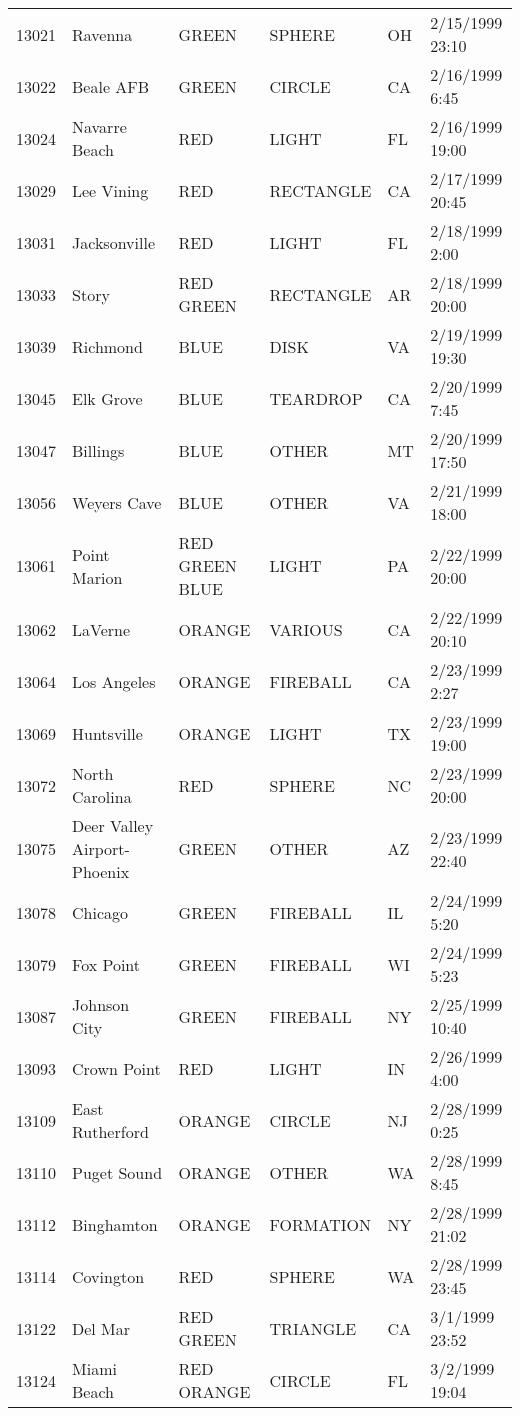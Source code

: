 \begin{tabular}{llllll}
13021 & Ravenna & GREEN & SPHERE & OH & 2/15/1999 23:10 \\
13022 & Beale AFB & GREEN & CIRCLE & CA & 2/16/1999 6:45 \\
13024 & Navarre Beach & RED & LIGHT & FL & 2/16/1999 19:00 \\
13029 & Lee Vining & RED & RECTANGLE & CA & 2/17/1999 20:45 \\
13031 & Jacksonville & RED & LIGHT & FL & 2/18/1999 2:00 \\
13033 & Story & RED GREEN & RECTANGLE & AR & 2/18/1999 20:00 \\
13039 & Richmond & BLUE & DISK & VA & 2/19/1999 19:30 \\
13045 & Elk Grove & BLUE & TEARDROP & CA & 2/20/1999 7:45 \\
13047 & Billings & BLUE & OTHER & MT & 2/20/1999 17:50 \\
13056 & Weyers Cave & BLUE & OTHER & VA & 2/21/1999 18:00 \\
13061 & Point Marion & RED GREEN BLUE & LIGHT & PA & 2/22/1999 20:00 \\
13062 & LaVerne & ORANGE & VARIOUS & CA & 2/22/1999 20:10 \\
13064 & Los Angeles & ORANGE & FIREBALL & CA & 2/23/1999 2:27 \\
13069 & Huntsville & ORANGE & LIGHT & TX & 2/23/1999 19:00 \\
13072 & North Carolina & RED & SPHERE & NC & 2/23/1999 20:00 \\
13075 & Deer Valley Airport-Phoenix & GREEN & OTHER & AZ & 2/23/1999 22:40 \\
13078 & Chicago & GREEN & FIREBALL & IL & 2/24/1999 5:20 \\
13079 & Fox Point & GREEN & FIREBALL & WI & 2/24/1999 5:23 \\
13087 & Johnson City & GREEN & FIREBALL & NY & 2/25/1999 10:40 \\
13093 & Crown Point & RED & LIGHT & IN & 2/26/1999 4:00 \\
13109 & East Rutherford & ORANGE & CIRCLE & NJ & 2/28/1999 0:25 \\
13110 & Puget Sound & ORANGE & OTHER & WA & 2/28/1999 8:45 \\
13112 & Binghamton & ORANGE & FORMATION & NY & 2/28/1999 21:02 \\
13114 & Covington & RED & SPHERE & WA & 2/28/1999 23:45 \\
13122 & Del Mar & RED GREEN & TRIANGLE & CA & 3/1/1999 23:52 \\
13124 & Miami Beach & RED ORANGE & CIRCLE & FL & 3/2/1999 19:04 \\

\end{tabular}

